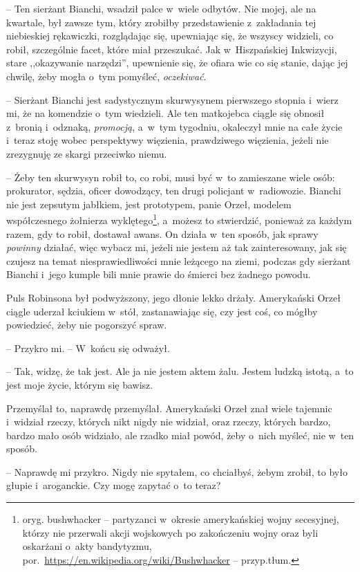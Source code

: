 \documentclass[oneside,polish,11pt,sfheadings]{mwbk}
\begin{document}
-- Ten sierżant Bianchi, wsadził palce w~wiele odbytów. Nie mojej, ale na
kwartale, był zawsze tym, który zrobiłby przedstawienie z~zakładania tej
niebieskiej rękawiczki, rozglądając się, upewniając się, że wszyscy
widzieli, co robił, szczególnie facet, które miał przeszukać. Jak w~Hiszpańskiej Inkwizycji, stare ,,okazywanie narzędzi'', upewnienie się,
że ofiara wie co się stanie, dając jej chwilę, żeby mogła o~tym
pomyśleć, \textit{oczekiwać}.

-- Sierżant Bianchi jest sadystycznym skurwysynem pierwszego stopnia i~wierz mi, że na komendzie o~tym wiedzieli. Ale ten matkojebca ciągle się
obnosił z~bronią i~odznaką, \textit{promocją}, a~w~tym tygodniu, okaleczył
mnie na całe życie i~teraz stoję wobec perspektywy więzienia,
prawdziwego więzienia, jeżeli nie zrezygnuję ze skargi przeciwko niemu.

-- Żeby ten skurwysyn robił to, co robi, musi być w~to zamieszane wiele
osób: prokurator, sędzia, oficer dowodzący, ten drugi policjant w~radiowozie. Bianchi nie jest zepsutym jabłkiem, jest prototypem, panie
Orzeł, modelem współczesnego żołnierza wyklętego\footnote{ oryg. bushwhacker -- partyzanci w~okresie amerykańskiej wojny secesyjnej, którzy nie
przerwali akcji wojskowych po zakończeniu wojny oraz byli oskarżani o~akty
bandytyzmu,
por.~\url{https://en.wikipedia.org/wiki/Bushwhacker} -- przyp.tłum.}, a~możesz to stwierdzić, ponieważ za każdym razem, gdy to
robił, dostawał awans. On działa w~ten sposób, jak sprawy \textit{powinny} działać, więc wybacz mi, jeżeli nie jestem aż tak zainteresowany, jak
się czujesz na temat niesprawiedliwości mnie leżącego na ziemi, podczas
gdy sierżant Bianchi i~jego kumple bili mnie prawie do śmierci bez
żadnego powodu.

Puls Robinsona był podwyższony, jego dłonie lekko drżały. Amerykański
Orzeł ciągle uderzał kciukiem w~stół, zastanawiając się, czy jest coś,
co mógłby powiedzieć, żeby nie pogorszyć spraw.

-- Przykro mi. -- W~końcu się odważył.

-- Tak, widzę, że tak jest. Ale ja nie jestem aktem żalu. Jestem ludzką
istotą, a~to jest moje życie, którym się bawisz.

Przemyślał to, naprawdę przemyślał. Amerykański Orzeł znał wiele
tajemnic i~widział rzeczy, których nikt nigdy nie widział, oraz rzeczy,
których bardzo, bardzo mało osób widziało, ale rzadko miał powód, żeby o~nich myśleć, nie w~ten sposób.

-- Naprawdę mi przykro. Nigdy nie spytałem, co chciałbyś, żebym zrobił,
to było głupie i~aroganckie. Czy mogę zapytać o~to teraz?
\end{document}
